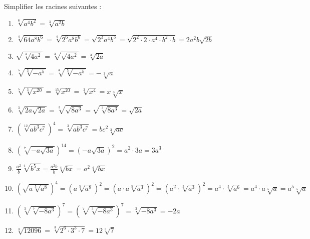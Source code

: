 \begin{solution}
Simplifier les racines suivantes :
\begin{enumerate}
\item $\sqrt[6]{{{a}^{4}}{{b}^{2}}}=\sqrt[3]{{{a}^{2}}b}$
\item $\sqrt[4]{64{{a}^{8}}{{b}^{6}}}=\sqrt[4]{{{2}^{6}}{{a}^{8}}{{b}^{6}}}=\sqrt{{{2}^{3}}{{a}^{4}}{{b}^{3}}}=\sqrt{{{2}^{2}}\cdot 2\cdot {{a}^{4}}\cdot {{b}^{2}}\cdot b}=2{{a}^{2}}b\sqrt{2b}$
\item $\sqrt{\sqrt[3]{4{{a}^{2}}}}=\sqrt[3]{\sqrt{4{{a}^{2}}}}=\sqrt[3]{2a}$
\item $\sqrt[5]{\sqrt[3]{-{{a}^{5}}}}=\sqrt[3]{\sqrt[5]{-{{a}^{5}}}}=-\sqrt[3]{a}$
\item $\sqrt[5]{\sqrt[3]{{{x}^{20}}}}=\sqrt[15]{{{x}^{20}}}=\sqrt[3]{{{x}^{4}}}=x\sqrt[3]{x}$
\item $\sqrt[3]{2a\sqrt{2a}}=\sqrt[3]{\sqrt{8{{a}^{3}}}}=\sqrt{\sqrt[3]{8{{a}^{3}}}}=\sqrt{2a}$
\item ${{\left( \sqrt[12]{a{{b}^{3}}{{c}^{7}}} \right)}^{4}}=\sqrt[3]{a{{b}^{3}}{{c}^{7}}}=b{{c}^{2}}\sqrt[3]{ac}$
\item ${{\left( \sqrt[7]{-a\sqrt{3a}} \right)}^{14}}={{\left( -a\sqrt{3a} \right)}^{2}}={{a}^{2}}\cdot 3a=3{{a}^{3}}$
\item $\frac{{{a}^{2}}}{b}\sqrt[4]{{{b}^{5}}x}=\frac{{{a}^{2}}b}{b}\sqrt[4]{bx}={{a}^{2}}\sqrt[4]{bx}$
\item ${{\left( \sqrt{a\sqrt[5]{{{a}^{8}}}} \right)}^{4}}={{\left( a\sqrt[5]{{{a}^{8}}} \right)}^{2}}={{\left( a\cdot a\sqrt[5]{{{a}^{3}}} \right)}^{2}}={{\left( {{a}^{2}}\cdot \sqrt[5]{{{a}^{3}}} \right)}^{2}}={{a}^{4}}\cdot \sqrt[5]{{{a}^{6}}}={{a}^{4}}\cdot a\sqrt[5]{a}={{a}^{5}}\sqrt[5]{a}$
\item ${{\left( \sqrt[3]{\sqrt[7]{-8{{a}^{3}}}} \right)}^{7}}={{\left( \sqrt[7]{\sqrt[3]{-8{{a}^{3}}}} \right)}^{7}}=\sqrt[3]{-8{{a}^{3}}}=-2a$
\item $\sqrt[3]{12096}=\sqrt[3]{{{2}^{6}}\cdot {{3}^{3}}\cdot 7}=12\sqrt[3]{7}$
\end{enumerate}
\end{solution}

